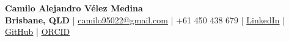 \begin{center}
      {\LARGE \textbf{Camilo Alejandro Vélez Medina}} \\
      \vspace{0.3em}
      \textbf{Brisbane, QLD} \quad | \quad
      \href{mailto:camilo95022@gmail.com}{camilo95022@gmail.com} \quad | \quad
      +61 450 438 679 \quad | \quad
      \href{https://www.linkedin.com/in/camilo-alejandro-v%C3%A9lez-medina-1b447a144}{LinkedIn} \quad | \quad
      \href{https://github.com/Camilovelez1}{GitHub} \quad | \quad
      \href{https://orcid.org/0009-0000-8515-2545}{ORCID}
  \end{center}